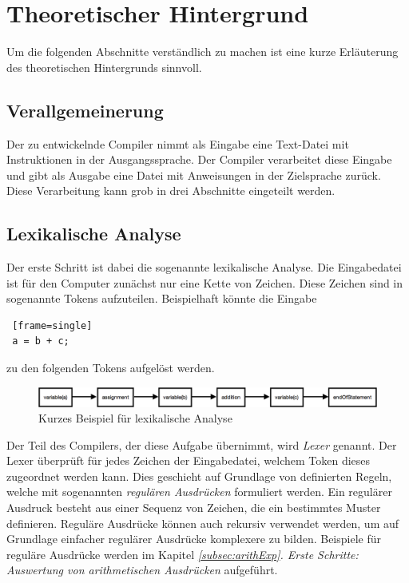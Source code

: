 
\section{Theoretischer Hintergrund}
Um die folgenden Abschnitte verständlich zu machen ist eine kurze Erläuterung des theoretischen Hintergrunds sinnvoll.
\subsection{Verallgemeinerung}
Der zu entwickelnde Compiler nimmt als Eingabe eine Text-Datei mit Instruktionen in der Ausgangssprache. Der Compiler verarbeitet diese Eingabe und gibt als Ausgabe eine Datei mit Anweisungen in der Zielsprache zurück. Diese Verarbeitung kann grob in drei Abschnitte eingeteilt werden.
\subsection{Lexikalische Analyse}
Der erste Schritt ist dabei die sogenannte lexikalische Analyse. Die Eingabedatei ist für den Computer zunächst nur eine Kette von Zeichen. Diese Zeichen sind in sogenannte Tokens aufzuteilen. Beispielhaft könnte die Eingabe
\begin{lstlisting} [frame=single]
 a = b + c;
\end{lstlisting}

zu den folgenden Tokens aufgelöst werden.


\begin{figure}[h!]
\centering
\includegraphics[scale=0.5]{pics/lex_beispiel.png}
\caption{Kurzes Beispiel für lexikalische Analyse}

\end{figure}

Der Teil des Compilers, der diese Aufgabe übernimmt, wird \textit{Lexer} genannt. Der Lexer überprüft für jedes Zeichen der Eingabedatei, welchem Token dieses zugeordnet werden kann. Dies geschieht auf Grundlage von definierten Regeln, welche mit sogenannten \textit{regulären Ausdrücken} formuliert werden. Ein regulärer Ausdruck besteht aus einer Sequenz von Zeichen, die ein bestimmtes Muster definieren. Reguläre Ausdrücke können auch rekursiv verwendet werden, um auf Grundlage einfacher regulärer Ausdrücke komplexere zu bilden. Beispiele für reguläre Ausdrücke werden im Kapitel \textit{\ref{subsec:arithExp}. Erste Schritte: Auswertung von arithmetischen Ausdrücken} aufgeführt.

